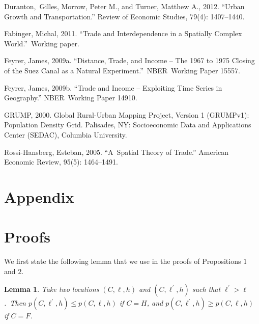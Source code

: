 \documentclass[12pt]{article}
\newtheorem{lemma}{Lemma}
\begin{document}
\begin{thebibliography}{99}
\bibitem{} Duranton,\ Gilles, Morrow, Peter M., and Turner, Matthew A.,
2012. ``Urban Growth and Transportation.'' Review of Economic Studies, 79(4):
1407--1440.

\bibitem{} Fabinger, Michal, 2011. \textquotedblleft Trade and
Interdependence in a Spatially Complex World.\textquotedblright \ Working
paper.

\bibitem{} Feyrer, James, 2009a. ``Distance, Trade, and Income -- The 1967 to
1975 Closing of the Suez Canal as a Natural Experiment.''\ NBER\ Working
Paper 15557.

\bibitem{} Feyrer, James, 2009b. ``Trade and Income -- Exploiting Time Series
in Geography.'' NBER\ Working Paper 14910.

\bibitem{} GRUMP, 2000. Global Rural-Urban Mapping Project, Version 1
(GRUMPv1): Population Density Grid. Palisades, NY: Socioeconomic Data and
Applications Center (SEDAC), Columbia University.

\bibitem{} Rossi-Hansberg, Esteban, 2005. ``A\ Spatial Theory of Trade.''
American Economic Review, 95(5): 1464--1491.
\end{thebibliography}

\appendix
\section*{Appendix}%

\section{Proofs}

We first state the following lemma that we use in the proofs of Propositions 
$1$ and $2$.

\begin{lemma}
Take two locations $\left( C,\ell ,h\right) $ and $\left( C,\ell ^{\prime
},h\right) $ such that $\ell ^{\prime }>\ell $.\ Then $p\left( C,\ell
^{\prime },h\right) \leq p\left( C,\ell ,h\right) $ if $C=H$, and $p\left(
C,\ell ^{\prime },h\right) \geq p\left( C,\ell ,h\right) $ if $C=F$.
\end{lemma}
\end{document}
